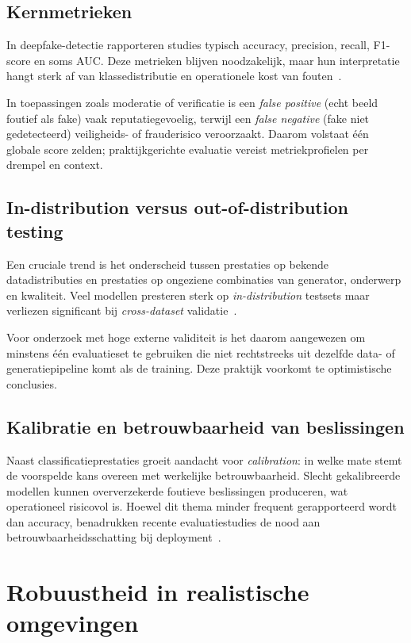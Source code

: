 \subsection{Kernmetrieken}
In deepfake-detectie rapporteren studies typisch accuracy, precision, recall, F1-score en soms AUC. Deze metrieken blijven noodzakelijk, maar hun interpretatie hangt sterk af van klassedistributie en operationele kost van fouten~\autocite{Raza2026,EvaluationModels2025}. 

In toepassingen zoals moderatie of verificatie is een \emph{false positive} (echt beeld foutief als fake) vaak reputatiegevoelig, terwijl een \emph{false negative} (fake niet gedetecteerd) veiligheids- of frauderisico veroorzaakt. Daarom volstaat één globale score zelden; praktijkgerichte evaluatie vereist metriekprofielen per drempel en context.

\subsection{In-distribution versus out-of-distribution testing}
Een cruciale trend is het onderscheid tussen prestaties op bekende datadistributies en prestaties op ongeziene combinaties van generator, onderwerp en kwaliteit. Veel modellen presteren sterk op \emph{in-distribution} testsets maar verliezen significant bij \emph{cross-dataset} validatie~\autocite{Pei2024,OpenSet2025}. 

Voor onderzoek met hoge externe validiteit is het daarom aangewezen om minstens één evaluatieset te gebruiken die niet rechtstreeks uit dezelfde data- of generatiepipeline komt als de training. Deze praktijk voorkomt te optimistische conclusies.

\subsection{Kalibratie en betrouwbaarheid van beslissingen}
Naast classificatieprestaties groeit aandacht voor \emph{calibration}: in welke mate stemt de voorspelde kans overeen met werkelijke betrouwbaarheid. Slecht gekalibreerde modellen kunnen oververzekerde foutieve beslissingen produceren, wat operationeel risicovol is. Hoewel dit thema minder frequent gerapporteerd wordt dan accuracy, benadrukken recente evaluatiestudies de nood aan betrouwbaarheidsschatting bij deployment~\autocite{EvaluationModels2025}.

\section{Robuustheid in realistische omgevingen}

